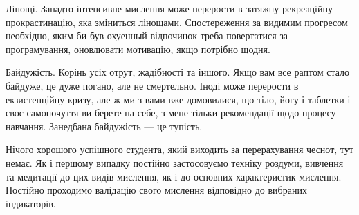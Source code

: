 Лінощі. Занадто інтенсивне мислення може перерости в затяжну
рекреаційну прокрастинацію, яка зміниться лінощами.
Спостереження за видимим прогресом необхідно, яким би був
охуенный відпочинок треба повертатися за програмування,
оновлювати мотивацію, якщо потрібно щодня.

Байдужість. Корінь усіх отрут, жадібності та іншого. Якщо
вам все раптом стало байдуже, це дуже погано, але не смертельно.
Іноді може перерости в екзистенційну кризу, але ж ми з вами вже
домовилися, що тіло, йогу і таблетки і своє самопочуття ви
берете на себе, з мене тільки рекомендації щодо процесу
навчання. Занедбана байдужість --- це тупість.

Нічого хорошого успішного студента, який виходить за
перерахування чеснот, тут немає. Як і першому випадку
постійно застосовуємо техніку роздуми, вивчення та
медитації до цих видів мислення, як і до основних характеристик
мислення. Постійно проходимо валідацію свого мислення відповідно
до вибраних індикаторів.

\normalsize
